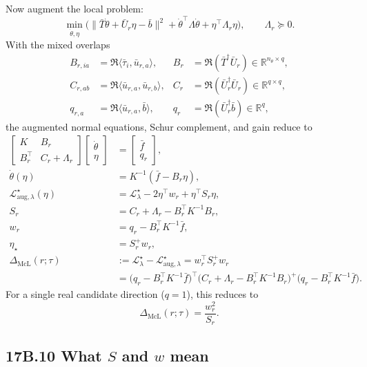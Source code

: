 \documentclass[11pt]{article}
\begin{document}
Now augment the local problem:
\[
\min_{\dot\theta,\eta}\Big(\|\bar T\dot\theta+\bar U_r\eta-\bar b\|^2+\dot\theta^\top\Lambda\dot\theta+\eta^\top\Lambda_r\eta\Big),
\qquad
\Lambda_r\succeq 0.
\]
With the mixed overlaps
\[
\begin{aligned}
B_{r,ia}&=\Re\langle \bar\tau_i,\bar u_{r,a}\rangle,&
B_r&=\Re(\bar T^\dagger\bar U_r)\in\mathbb R^{n_\theta\times q},\\
C_{r,ab}&=\Re\langle \bar u_{r,a},\bar u_{r,b}\rangle,&
C_r&=\Re(\bar U_r^\dagger\bar U_r)\in\mathbb R^{q\times q},\\
q_{r,a}&=\Re\langle \bar u_{r,a},\bar b\rangle,&
q_r&=\Re(\bar U_r^\dagger\bar b)\in\mathbb R^q,
\end{aligned}
\]
the augmented normal equations, Schur complement, and gain reduce to
\[
\begin{aligned}
\begin{bmatrix}K&B_r\\B_r^\top&C_r+\Lambda_r\end{bmatrix}\begin{bmatrix}\dot\theta\\\eta\end{bmatrix}&=\begin{bmatrix}\bar f\\q_r\end{bmatrix},\\
\dot\theta(\eta)&=K^{-1}(\bar f-B_r\eta),\\
\mathcal L_{\mathrm{aug},\lambda}^\star(\eta)&=\mathcal L_\lambda^\star-2\eta^\top w_r+\eta^\top S_r\eta,\\
S_r&=C_r+\Lambda_r-B_r^\top K^{-1}B_r,\\
w_r&=q_r-B_r^\top K^{-1}\bar f,\\
\eta_\star&=S_r^+w_r,\\
\Delta_{\mathrm{McL}}(r;\tau)&:=\mathcal L_\lambda^\star-\mathcal L_{\mathrm{aug},\lambda}^\star=w_r^\top S_r^+w_r\\
&=\bigl(q_r-B_r^\top K^{-1}\bar f\bigr)^\top\bigl(C_r+\Lambda_r-B_r^\top K^{-1}B_r\bigr)^+\bigl(q_r-B_r^\top K^{-1}\bar f\bigr).
\end{aligned}
\]
For a single real candidate direction ($q=1$), this reduces to
\[
\Delta_{\mathrm{McL}}(r;\tau)=\frac{w_r^2}{S_r}.
\]

\subsection*{17B.10 What $S$ and $w$ mean}
\end{document}

